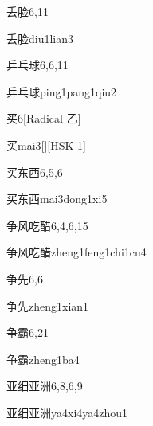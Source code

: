 \begin{entry}{丢脸}{6,11}
  \begin{phonetics}{丢脸}{diu1lian3}
  \end{phonetics}
\end{entry}

\begin{entry}{乒乓球}{6,6,11}
  \begin{phonetics}{乒乓球}{ping1pang1qiu2}
  \end{phonetics}
\end{entry}

\begin{entry}{买}{6}[Radical 乙]
  \begin{phonetics}{买}{mai3}[][HSK 1]
  \end{phonetics}
\end{entry}

\begin{entry}{买东西}{6,5,6}
  \begin{phonetics}{买东西}{mai3dong1xi5}
  \end{phonetics}
\end{entry}

\begin{entry}{争风吃醋}{6,4,6,15}
  \begin{phonetics}{争风吃醋}{zheng1feng1chi1cu4}
  \end{phonetics}
\end{entry}

\begin{entry}{争先}{6,6}
  \begin{phonetics}{争先}{zheng1xian1}
  \end{phonetics}
\end{entry}

\begin{entry}{争霸}{6,21}
  \begin{phonetics}{争霸}{zheng1ba4}
  \end{phonetics}
\end{entry}

\begin{entry}{亚细亚洲}{6,8,6,9}
  \begin{phonetics}{亚细亚洲}{ya4xi4ya4zhou1}
  \end{phonetics}
\end{entry}

